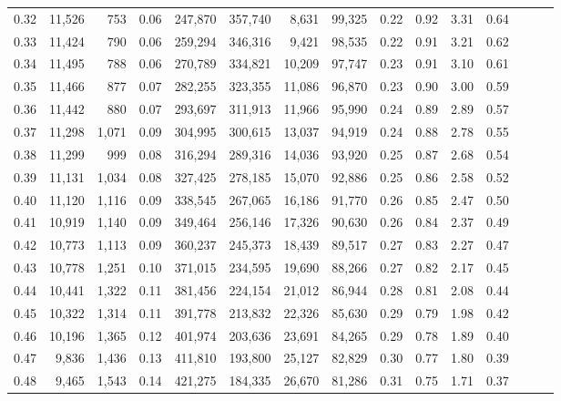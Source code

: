\begin{tabular}{rrrrrrrrrrrrrrr}
0.32 &  11,526 &    753 &  0.06 &  247,870 &  357,740 &    8,631 &   99,325 &  0.22 &  0.92 &  3.31 &      0.64 \\
0.33 &  11,424 &    790 &  0.06 &  259,294 &  346,316 &    9,421 &   98,535 &  0.22 &  0.91 &  3.21 &      0.62 \\
0.34 &  11,495 &    788 &  0.06 &  270,789 &  334,821 &   10,209 &   97,747 &  0.23 &  0.91 &  3.10 &      0.61 \\
0.35 &  11,466 &    877 &  0.07 &  282,255 &  323,355 &   11,086 &   96,870 &  0.23 &  0.90 &  3.00 &      0.59 \\
0.36 &  11,442 &    880 &  0.07 &  293,697 &  311,913 &   11,966 &   95,990 &  0.24 &  0.89 &  2.89 &      0.57 \\
0.37 &  11,298 &  1,071 &  0.09 &  304,995 &  300,615 &   13,037 &   94,919 &  0.24 &  0.88 &  2.78 &      0.55 \\
0.38 &  11,299 &    999 &  0.08 &  316,294 &  289,316 &   14,036 &   93,920 &  0.25 &  0.87 &  2.68 &      0.54 \\
0.39 &  11,131 &  1,034 &  0.08 &  327,425 &  278,185 &   15,070 &   92,886 &  0.25 &  0.86 &  2.58 &      0.52 \\
0.40 &  11,120 &  1,116 &  0.09 &  338,545 &  267,065 &   16,186 &   91,770 &  0.26 &  0.85 &  2.47 &      0.50 \\
0.41 &  10,919 &  1,140 &  0.09 &  349,464 &  256,146 &   17,326 &   90,630 &  0.26 &  0.84 &  2.37 &      0.49 \\
0.42 &  10,773 &  1,113 &  0.09 &  360,237 &  245,373 &   18,439 &   89,517 &  0.27 &  0.83 &  2.27 &      0.47 \\
0.43 &  10,778 &  1,251 &  0.10 &  371,015 &  234,595 &   19,690 &   88,266 &  0.27 &  0.82 &  2.17 &      0.45 \\
0.44 &  10,441 &  1,322 &  0.11 &  381,456 &  224,154 &   21,012 &   86,944 &  0.28 &  0.81 &  2.08 &      0.44 \\
0.45 &  10,322 &  1,314 &  0.11 &  391,778 &  213,832 &   22,326 &   85,630 &  0.29 &  0.79 &  1.98 &      0.42 \\
0.46 &  10,196 &  1,365 &  0.12 &  401,974 &  203,636 &   23,691 &   84,265 &  0.29 &  0.78 &  1.89 &      0.40 \\
0.47 &   9,836 &  1,436 &  0.13 &  411,810 &  193,800 &   25,127 &   82,829 &  0.30 &  0.77 &  1.80 &      0.39 \\
0.48 &   9,465 &  1,543 &  0.14 &  421,275 &  184,335 &   26,670 &   81,286 &  0.31 &  0.75 &  1.71 &      0.37 \\

\end{tabular}
